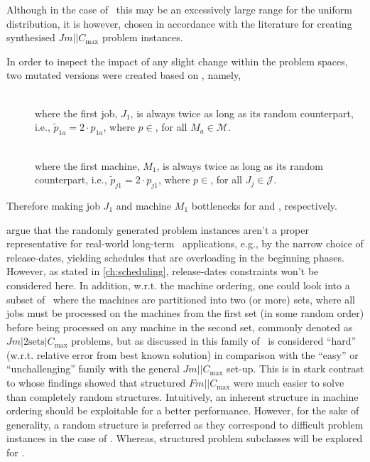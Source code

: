 Although in the case of \ this may be an excessively large range for 
the uniform distribution, it is however, chosen in accordance with the 
literature \citep{Demirkol98} for creating synthesised $Jm||C_{\max}$ problem 
instances. 

In order to inspect the impact of any slight change within the problem spaces, 
two mutated versions were created based on , namely, 
\begin{description}
	\item[\JrndJ]  \hfill \\ where the first job, $J_1$, is always twice as long as its random counterpart, i.e.,\linebreak
	$\tilde{p}_{1a}=2\cdot p_{1a}$, where $p\in$, for all $M_a\in\mathcal{M}$. 
	\item[\JrndM]  \hfill \\ where the first machine, $M_1$, is always twice as long as its random counterpart, i.e.,\linebreak
	$\tilde{p}_{j1}=2\cdot p_{j1}$, where $p\in$, for all $J_j\in\mathcal{J}$. 
\end{description}
Therefore making job $J_1$ and machine $M_1$ bottlenecks for  and 
, respectively.

\citet{Hildebrandt2010} argue that the randomly generated problem 
instances aren't a proper representative for real-world long-term \jsp\   
applications, e.g., by the narrow choice of release-dates, yielding schedules 
that are overloading in the beginning phases. However, as stated in
\cref{ch:scheduling}, release-dates constraints won't be considered here.
In addition, w.r.t. the machine ordering, one could look into a 
subset of \JSP\ where the machines are partitioned into two (or more) sets, 
where all jobs must be processed on the machines from the first set (in some 
random order) before being processed on any machine in the second set, commonly 
denoted as $Jm|2\textrm{sets}|C_{\max}$ problems, but as discussed in 
\cite{orlib_swv} this family of \JSP\ is considered ``hard'' (w.r.t. relative 
error from best known solution) in comparison with the ``easy'' or 
``unchallenging'' family with the general $Jm||C_{\max}$ set-up. %
This is in stark contrast to \citet{Whitley} whose findings showed that 
structured $Fm||C_{\max}$ were much easier to solve than completely random 
structures. 
Intuitively, an inherent structure in machine ordering should be exploitable 
for a better performance.  However, for the sake of generality, a random 
structure is preferred as they correspond to difficult problem instances in the 
case of \JSP. Whereas, structured problem subclasses will be explored for 
\FSP.  

